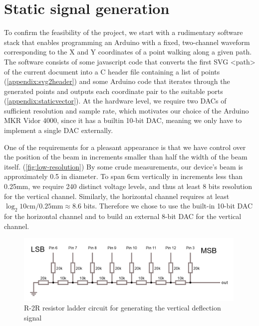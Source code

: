 \documentclass[12pt]{article}
\begin{document}
\section{Static signal generation}

To confirm the feasibility of the project, we start with a rudimentary software stack that enables programming an Arduino with a fixed, two-channel waveform corresponding to the X and Y coordinates of a point walking along a given path. The software consists of some javascript code that converts the first SVG <path> of the current document into a C header file containing a list of points (\autoref{appendix:svg2header}) and some Arduino code that iterates through the generated points and outputs each coordinate pair to the suitable ports (\autoref{appendix:staticvector}). At the hardware level, we require two DACs of sufficient resolution and sample rate, which motivates our choice of the Arduino MKR Vidor 4000, since it has a builtin 10-bit DAC, meaning we only have to implement a single DAC externally.

One of the requirements for a pleasant appearance is that we have control over the position of the beam in increments smaller than half the width of the beam itself. (\autoref{fig:low-resolution}) By some crude measurements, our device's beam is approximately 0.5 in diameter. To span 6cm vertically in increments less than 0.25mm, we require 240 distinct voltage levels, and thus at least 8 bits resolution for the vertical channel. Similarly, the horizontal channel requires at least \( \log_2{10\text{cm}/0.25\text{mm}} \approx 8.6 \) bits. Therefore we chose to use the built-in 10-bit DAC for the horizontal channel and to build an external 8-bit DAC for the vertical channel.

\begin{figure}[h]
\centering
\includegraphics[width=0.99\textwidth]{images/r2r-circuit.png}
\caption{R-2R resistor ladder circuit for generating the vertical deflection signal}
\end{figure}
\end{document}
